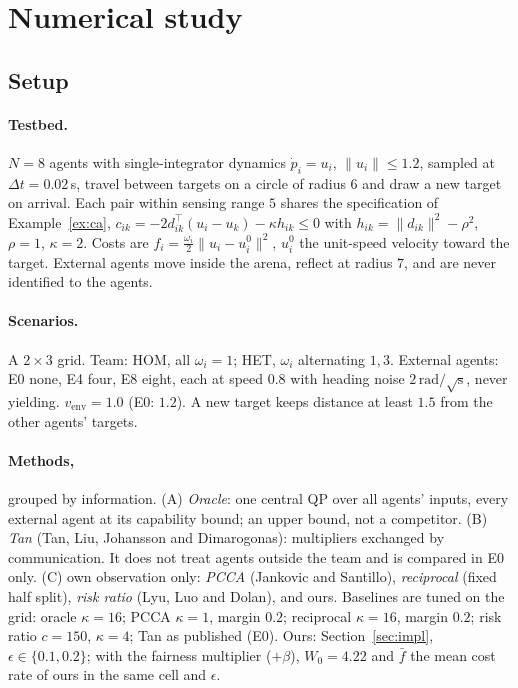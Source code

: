 \documentclass[11pt]{article}
\theoremstyle{definition}
\theoremstyle{remark}
\begin{document}
\section{Numerical study}\label{sec:num}
\subsection{Setup}
\paragraph{Testbed.} $N=8$ agents with single-integrator dynamics $\dot p_i=u_i$, $\|u_i\|\le1.2$, sampled at $\Delta t=0.02$\,s, travel between targets on a circle of radius $6$ and draw a new target on arrival. Each pair within sensing range $5$ shares the specification of Example~\ref{ex:ca}, $c_{ik}=-2d_{ik}^\top(u_i-u_k)-\kappa h_{ik}\le0$ with $h_{ik}=\|d_{ik}\|^2-\rho^2$, $\rho=1$, $\kappa=2$. Costs are $f_i=\frac{\omega_i}2\|u_i-u_i^0\|^2$, $u_i^0$ the unit-speed velocity toward the target. External agents move inside the arena, reflect at radius $7$, and are never identified to the agents.

\paragraph{Scenarios.} A $2\times3$ grid. Team: HOM, all $\omega_i=1$; HET, $\omega_i$ alternating $1,3$. External agents: E0 none, E4 four, E8 eight, each at speed $0.8$ with heading noise $2\,\mathrm{rad}/\sqrt{\mathrm s}$, never yielding. $v_{\mathrm{env}}=1.0$ (E0: $1.2$). A new target keeps distance at least $1.5$ from the other agents' targets.

\paragraph{Methods,} grouped by information. (A) \emph{Oracle}: one central QP over all agents' inputs, every external agent at its capability bound; an upper bound, not a competitor. (B) \emph{Tan} (Tan, Liu, Johansson and Dimarogonas): multipliers exchanged by communication. It does not treat agents outside the team and is compared in E0 only. (C) own observation only: \emph{PCCA} (Jankovic and Santillo), \emph{reciprocal} (fixed half split), \emph{risk ratio} (Lyu, Luo and Dolan), and ours. Baselines are tuned on the grid: oracle $\kappa=16$; PCCA $\kappa=1$, margin $0.2$; reciprocal $\kappa=16$, margin $0.2$; risk ratio $c=150$, $\kappa=4$; Tan as published (E0). Ours: Section~\ref{sec:impl}, $\epsilon\in\{0.1,0.2\}$; with the fairness multiplier ($+\beta$), $W_0=4.22$ and $\bar f$ the mean cost rate of ours in the same cell and $\epsilon$.
\end{document}
